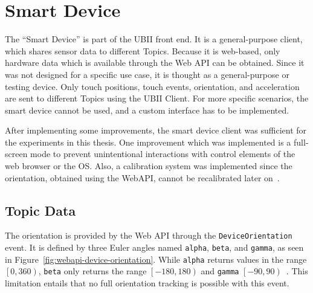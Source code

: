 \section{Smart Device}\label{section:smart-device}

The \enquote{Smart Device} is part of the \gls{UBII} front end. It is a general-purpose client, which shares sensor data to different Topics. Because it is web-based, only hardware data which is available through the Web \gls{API} can be obtained. Since it was not designed for a specific use case, it is thought as a general-purpose or testing device. Only touch positions, touch events, orientation, and acceleration are sent to different Topics using the \gls{UBII} Client. For more specific scenarios, the smart device cannot be used, and a custom interface has to be implemented.

After implementing some improvements, the smart device client was sufficient for the experiments in this thesis. One improvement which was implemented is a full-screen mode to prevent unintentional interactions with control elements of the web browser or the \gls{OS}.
Also, a calibration system was implemented since the orientation, obtained using the Web\gls{API}, cannot be recalibrated later on~\cite{DevicesandSensorsWorkingGroup.2019}. 


\subsection{Topic Data}\label{subsection:topic-data}

The orientation is provided by the Web \gls{API} through the \lstinline{DeviceOrientation} event. It is defined by three Euler angles named \lstinline{alpha}, \lstinline{beta}, and \lstinline{gamma}, as seen in Figure~\ref{fig:webapi-device-orientation}.
While \lstinline{alpha} returns values in the range \(\left[0, 360\right)\), \lstinline{beta} only returns the range \(\left[-180, 180\right)\) and \lstinline{gamma} \(\left[-90, 90\right)\)~\cite[Chapter~4.1]{DevicesandSensorsWorkingGroup.2019}. %
This limitation entails that no full orientation tracking is possible with this event.

